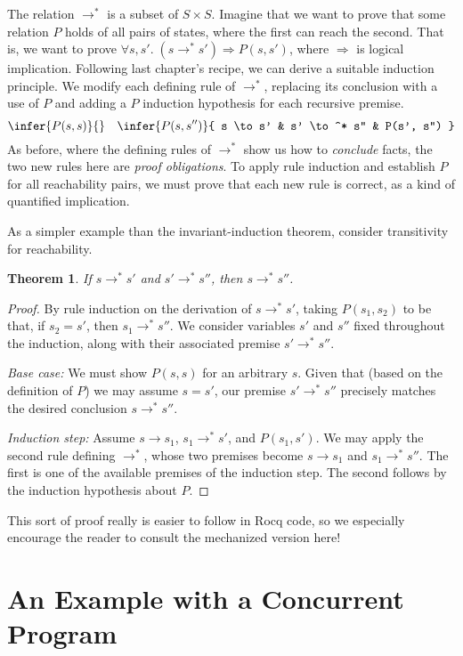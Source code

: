 \documentclass{amsbook}
\newtheorem{theorem}{Theorem}[chapter]
\theoremstyle{definition}
\theoremstyle{remark}
\numberwithin{section}{chapter}
\numberwithin{equation}{chapter}
\begin{document}
The relation $\to^*$ is a subset of $S \times S$.
Imagine that we want to prove that some relation $P$ holds of all pairs of states, where the first can reach the second.
That is, we want to prove $\forall s, s'. \; (s \to^* s') \Rightarrow P(s, s')$, where $\Rightarrow$ is logical implication.
Following last chapter's recipe, we can derive a suitable induction principle.
We modify each defining rule of $\to^*$, replacing its conclusion with a use of $P$ and adding a $P$ induction hypothesis for each recursive premise.
$$\infer{P(s, s)}{}
\quad \infer{P(s, s'')}{
  s \to s'
  & s' \to^* s''
  & P(s', s'')
}$$
As before, where the defining rules of $\to^*$ show us how to \emph{conclude} facts, the two new rules here are \emph{proof obligations}.
To apply rule induction and establish $P$ for all reachability pairs, we must prove that each new rule is correct, as a kind of quantified implication.

As a simpler example than the invariant-induction theorem, consider transitivity for reachability.

\begin{theorem}
  If $s \to^* s'$ and $s' \to^* s''$, then $s \to^* s''$.
\end{theorem}
\begin{proof}
  By rule induction on the derivation of $s \to^* s'$, taking $P(s_1, s_2)$ to be that, if $s_2 = s'$, then $s_1 \to^* s''$.  We consider variables $s'$ and $s''$ fixed throughout the induction, along with their associated premise $s' \to^* s''$.

  \emph{Base case:} We must show $P(s, s)$ for an arbitrary $s$.  Given that (based on the definition of $P$) we may assume $s = s'$, our premise $s' \to^* s''$ precisely matches the desired conclusion $s \to^* s''$.

  \emph{Induction step:} Assume $s \to s_1$, $s_1 \to^* s'$, and $P(s_1, s')$.  We may apply the second rule defining $\to^*$, whose two premises become $s \to s_1$ and $s_1 \to^* s''$.  The first is one of the available premises of the induction step.  The second follows by the induction hypothesis about $P$.
\end{proof}

This sort of proof really is easier to follow in Rocq code, so we especially encourage the reader to consult the mechanized version here!


\section{An Example with a Concurrent Program}
\end{document}
